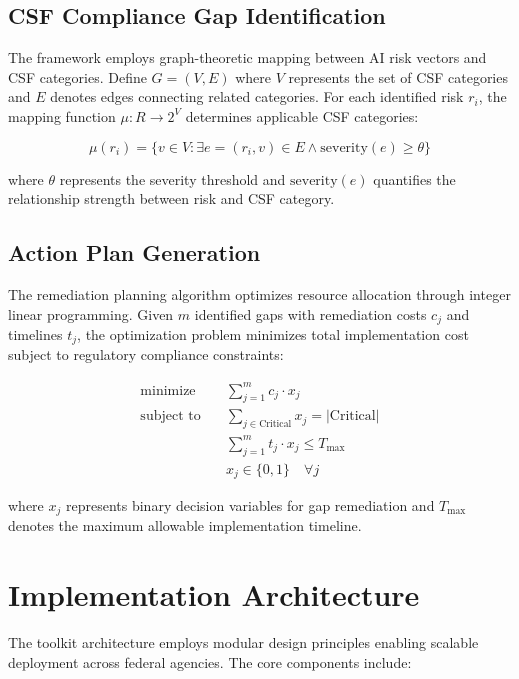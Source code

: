 \documentclass[11pt,letterpaper]{article}
\begin{document}
\subsection{CSF Compliance Gap Identification}

The framework employs graph-theoretic mapping between AI risk vectors and CSF categories. Define $G = (V, E)$ where $V$ represents the set of CSF categories and $E$ denotes edges connecting related categories. For each identified risk $r_i$, the mapping function $\mu: R \rightarrow 2^V$ determines applicable CSF categories:

\begin{equation}
\mu(r_i) = \{v \in V : \exists e = (r_i, v) \in E \land \text{severity}(e) \geq \theta\}
\end{equation}

where $\theta$ represents the severity threshold and $\text{severity}(e)$ quantifies the relationship strength between risk and CSF category.

\subsection{Action Plan Generation}

The remediation planning algorithm optimizes resource allocation through integer linear programming. Given $m$ identified gaps with remediation costs $c_j$ and timelines $t_j$, the optimization problem minimizes total implementation cost subject to regulatory compliance constraints:

\begin{align}
\text{minimize} \quad &\sum_{j=1}^{m} c_j \cdot x_j \\
\text{subject to} \quad &\sum_{j \in \text{Critical}} x_j = |\text{Critical}| \\
&\sum_{j=1}^{m} t_j \cdot x_j \leq T_{\max} \\
&x_j \in \{0, 1\} \quad \forall j
\end{align}

where $x_j$ represents binary decision variables for gap remediation and $T_{\max}$ denotes the maximum allowable implementation timeline.

\section{Implementation Architecture}

The toolkit architecture employs modular design principles enabling scalable deployment across federal agencies. The core components include:
\end{document}
